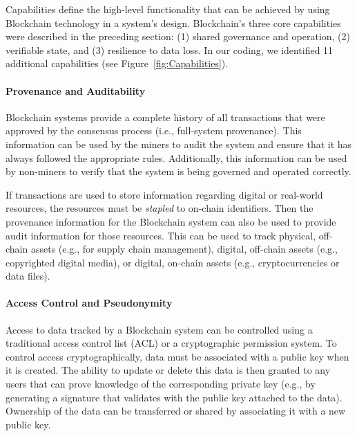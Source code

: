 Capabilities define the high-level functionality that can be achieved by using Blockchain technology in a system's design.
Blockchain's three core capabilities were described in the preceding section: (1) shared governance and operation, (2) verifiable state, and (3) resilience to data loss.
In our coding, we identified 11 additional capabilities (see Figure~\ref{fig:Capabilities}).

\paragraph{Provenance and Auditability}
Blockchain systems provide a complete history of all transactions that were approved by the consensus process (i.e., full-system provenance).
This information can be used by the miners to audit the system and ensure that it has always followed the appropriate rules.
Additionally, this information can be used by non-miners to verify that the system is being governed and operated correctly.

If transactions are used to store information regarding digital or real-world resources, the resources must be \emph{stapled} to on-chain identifiers. Then the provenance information for the Blockchain system can also be used to provide audit information for those resources.
This can be used to track physical, off-chain assets (e.g., for supply chain management), digital, off-chain assets (e.g., copyrighted digital media), or digital, on-chain assets (e.g., cryptocurrencies or data files).
 
\paragraph{Access Control and Pseudonymity}
Access to data tracked by a Blockchain system can be controlled using a 
traditional access control list (ACL) or a cryptographic permission system.
To control access cryptographically, data must be associated with a public key 
when it is created.
The ability to update or delete this data is then granted to any users that can prove knowledge of the corresponding private key (e.g., by generating a signature that validates with the public key attached to the data).
Ownership of the data can be transferred or shared by associating it with a new public key.


